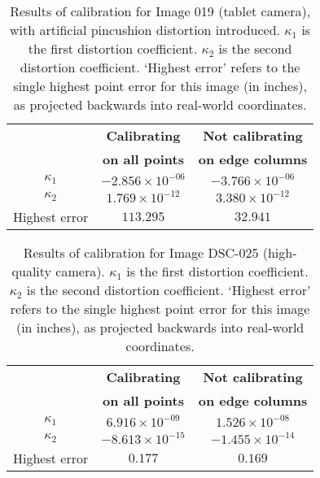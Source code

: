 \begin{table}[h!]
  \centering
  \begin{tabular}{c c c}
    \toprule
    \textbf{ } & \textbf{Calibrating} & \textbf{Not calibrating}\\
    \textbf{ } & \textbf{on all points} & \textbf{on edge columns}\\
    \midrule
    $\kappa_{1}$ & $-2.856 \times 10^{-06}$ & $-3.766 \times 10^{-06}$\\
    $\kappa_{2}$ & $1.769 \times 10^{-12}$ & $3.380 \times 10^{-12}$\\
    Highest error & $113.295$ & $32.941$\\
    \bottomrule
  \end{tabular}
  \caption[Results of calibration for Image 019 (tablet camera) with pincushion distortion]{Results of calibration for Image 019 (tablet camera), with artificial pincushion distortion introduced. $\kappa_{1}$ is the first distortion coefficient. $\kappa_{2}$ is the second distortion coefficient. `Highest error' refers to the single highest point error for this image (in inches), as projected backwards into real-world coordinates.}
  \label{tbl:calibration-stats-090-3}
\end{table}

\begin{table}[h!]
  \centering
  \begin{tabular}{c c c}
    \toprule
    \textbf{ } & \textbf{Calibrating} & \textbf{Not calibrating}\\
    \textbf{ } & \textbf{on all points} & \textbf{on edge columns}\\
    \midrule
    $\kappa_{1}$ & $6.916 \times 10^{-09}$ & $1.526 \times 10^{-08}$\\
    $\kappa_{2}$ & $-8.613 \times 10^{-15}$ & $-1.455 \times 10^{-14}$\\
    Highest error & $0.177$ & $0.169$\\
    \bottomrule
  \end{tabular}
  \caption[Results of calibration for Image DSC-025 (high-quality camera)]{Results of calibration for Image DSC-025 (high-quality camera). $\kappa_{1}$ is the first distortion coefficient. $\kappa_{2}$ is the second distortion coefficient. `Highest error' refers to the single highest point error for this image (in inches), as projected backwards into real-world coordinates.}
  \label{tbl:calibration-stats-dsc-1}
\end{table}

